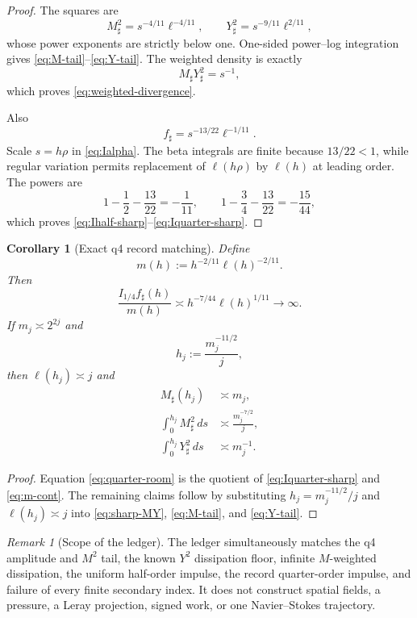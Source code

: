 \documentclass[11pt]{article}
\newtheorem{corollary}[theorem]{Corollary}
\theoremstyle{remark}
\newtheorem{remark}[theorem]{Remark}
\begin{document}
\begin{proof}
The squares are
\[
 M_\sharp^2=s^{-4/11}\ell^{-4/11},
 \qquad
 Y_\sharp^2=s^{-9/11}\ell^{2/11},
\]
whose power exponents are strictly below one.  One-sided power--log
integration gives \eqref{eq:M-tail}--\eqref{eq:Y-tail}.
The weighted density is exactly
\[
 M_\sharp Y_\sharp^2=s^{-1},
\]
which proves \eqref{eq:weighted-divergence}.

Also
\[
 f_\sharp=s^{-13/22}\ell^{-1/11}.
\]
Scale \(s=h\rho\) in \eqref{eq:Ialpha}.  The beta integrals are finite
because \(13/22<1\), while regular variation permits replacement of
\(\ell(h\rho)\) by \(\ell(h)\) at leading order.  The powers are
\[
 1-\frac12-\frac{13}{22}=-\frac1{11},
 \qquad
 1-\frac34-\frac{13}{22}=-\frac{15}{44},
\]
which proves \eqref{eq:Ihalf-sharp}--\eqref{eq:Iquarter-sharp}.
\end{proof}

\begin{corollary}[Exact q4 record matching]
\label{cor:records}
Define
\begin{equation}
\label{eq:m-cont}
 m(h):=h^{-2/11}\ell(h)^{-2/11}.
\end{equation}
Then
\begin{equation}
\label{eq:quarter-room}
 \frac{I_{1/4}f_\sharp(h)}{m(h)}
 \asymp
 h^{-7/44}\ell(h)^{1/11}
 \longrightarrow\infty.
\end{equation}
If \(m_j\asymp2^{2j}\) and
\[
 h_j:=\frac{m_j^{-11/2}}j,
\]
then \(\ell(h_j)\asymp j\) and
\begin{align}
\label{eq:record-M}
 M_\sharp(h_j)&\asymp m_j,\\
\label{eq:record-Mtail}
 \int_0^{h_j}M_\sharp^2\,ds
 &\asymp\frac{m_j^{-7/2}}j,\\
\label{eq:record-Ytail}
 \int_0^{h_j}Y_\sharp^2\,ds
 &\asymp m_j^{-1}.
\end{align}
\end{corollary}

\begin{proof}
Equation \eqref{eq:quarter-room} is the quotient of
\eqref{eq:Iquarter-sharp} and \eqref{eq:m-cont}.  The remaining claims
follow by substituting \(h_j=m_j^{-11/2}/j\) and
\(\ell(h_j)\asymp j\) into
\eqref{eq:sharp-MY}, \eqref{eq:M-tail}, and
\eqref{eq:Y-tail}.
\end{proof}

\begin{remark}[Scope of the ledger]
The ledger simultaneously matches the q4 amplitude and \(M^2\) tail,
the known \(Y^2\) dissipation floor, infinite \(M\)-weighted
dissipation, the uniform half-order impulse, the record quarter-order
impulse, and failure of every finite secondary index.  It does not
construct spatial fields, a pressure, a Leray projection, signed work,
or one Navier--Stokes trajectory.
\end{remark}
\end{document}
